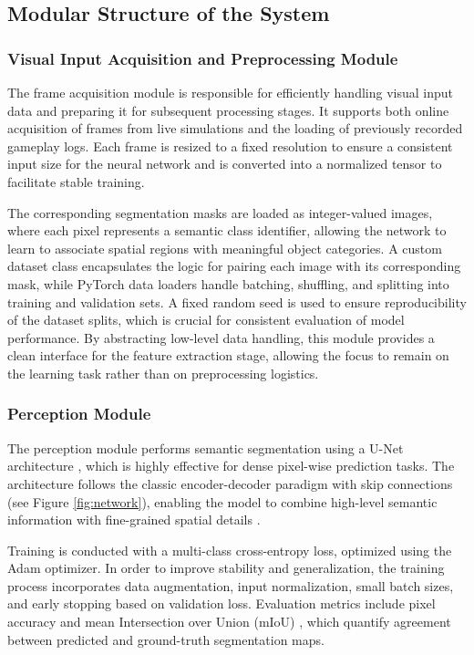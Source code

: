 \documentclass[12pt,a4paper]{report}
\begin{document}
\subsection{Modular Structure of the System}
\subsubsection{Visual Input Acquisition and Preprocessing Module}
The frame acquisition module is responsible for efficiently handling visual input data and preparing it for subsequent processing stages. It supports both online acquisition of frames from live simulations and the loading of previously recorded gameplay logs. 
Each frame is resized to a fixed resolution to ensure a consistent input size for the neural network and is converted into a normalized tensor to facilitate stable training.

The corresponding segmentation masks are loaded as integer-valued images, where each pixel represents a semantic class identifier, allowing the network to learn to associate spatial regions with meaningful object categories.
A custom dataset class encapsulates the logic for pairing each image with its corresponding mask, while PyTorch data loaders handle batching, shuffling, and splitting into training and validation sets. A fixed random seed is used to ensure reproducibility of the dataset splits, which is crucial for consistent evaluation of model performance. By abstracting low-level data handling, this module provides a clean interface for the feature extraction stage, allowing the focus to remain on the learning task rather than on preprocessing logistics.

\subsubsection{Perception Module}
The perception module performs semantic segmentation using a U-Net architecture \cite{chiave36}, which is highly effective for dense pixel-wise prediction tasks. The architecture follows the classic encoder-decoder paradigm with skip connections (see Figure \ref{fig:network}), enabling the model to combine high-level semantic information with fine-grained spatial details .

Training is conducted with a multi-class cross-entropy loss, optimized using the Adam optimizer. In order to improve stability and generalization, the training process incorporates data augmentation, input normalization, small batch sizes, and early stopping based on validation loss. Evaluation metrics include pixel accuracy and mean Intersection over Union (mIoU) \cite{chiave34}, which quantify agreement between predicted and ground-truth segmentation maps. 
\end{document}
